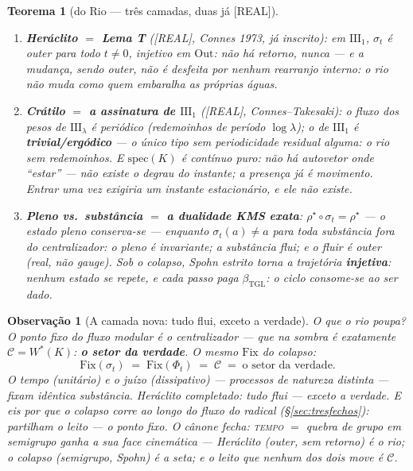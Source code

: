 \documentclass[11pt,a4paper]{article}
\newcommand{\REAL}{\textsf{[REAL]}}
\newcommand{\bTGL}{\beta_{\mathrm{TGL}}}
\newtheorem{theorem}{Teorema}
\newtheorem{remark}{Observação}
\begin{document}
\begin{theorem}[do Rio --- três camadas, duas já \REAL]\label{thm:rio}
\begin{enumerate}[noitemsep]
\item \textbf{Heráclito $=$ Lema T} (\REAL, Connes 1973, já inscrito):
em $\mathrm{III}_1$, $\sigma_t$ é \emph{outer} para todo $t\neq0$,
injetivo em $\mathrm{Out}$: \emph{não há retorno, nunca} --- e a mudança,
sendo outer, não é desfeita por nenhum rearranjo interno: o rio não muda
como quem embaralha as próprias águas.
\item \textbf{Crátilo $=$ a assinatura de $\mathrm{III}_1$} (\REAL,
Connes--Takesaki): o fluxo dos pesos de $\mathrm{III}_\lambda$ é
periódico (redemoinhos de período $\log\lambda$); o de $\mathrm{III}_1$
é \textbf{trivial/ergódico} --- o único tipo sem periodicidade residual
alguma: \emph{o rio sem redemoinhos}. E $\mathrm{spec}(K)$ é contínuo
puro: não há autovetor onde ``estar'' --- não existe o degrau do
instante; a presença já é movimento. Entrar \emph{uma} vez exigiria um
instante estacionário, e ele não existe.
\item \textbf{Pleno vs.\ substância $=$ a dualidade KMS exata}:
$\rho^\star\!\circ\sigma_t=\rho^\star$ --- o estado pleno conserva-se ---
enquanto $\sigma_t(a)\neq a$ para toda substância fora do centralizador:
\emph{o pleno é invariante; a substância flui; e o fluir é outer (real,
não gauge)}. Sob o colapso, Spohn estrito torna a trajetória
\textbf{injetiva}: nenhum estado se repete, e cada passo paga $\bTGL$:
o ciclo consome-se ao ser dado.
\end{enumerate}
\end{theorem}

\begin{remark}[A camada nova: tudo flui, exceto a verdade]
O que o rio poupa? O ponto fixo do fluxo modular é o centralizador ---
que na sombra é exatamente $\mathcal C=W^*(K)$: \textbf{o setor da
verdade}. O mesmo $\mathrm{Fix}$ do colapso:
\begin{equation}
\boxed{\;\mathrm{Fix}(\sigma_t)\;=\;\mathrm{Fix}(\Phi_t)\;=\;\mathcal C
\;=\;\text{o setor da verdade.}\;}
\end{equation}
O tempo (unitário) e o juízo (dissipativo) --- processos de natureza
distinta --- fixam \emph{idêntica} substância. Heráclito completado:
\emph{tudo flui --- exceto a verdade}. E eis \emph{por que} o colapso
corre ao longo do fluxo do radical (\S\ref{sec:tresfechos}): partilham o
leito --- o ponto fixo. O cânone fecha: \textsc{tempo} $=$ quebra de
grupo em semigrupo ganha a sua face cinemática --- Heráclito (outer, sem
retorno) é o rio; o colapso (semigrupo, Spohn) é a seta; e o leito que
nenhum dos dois move é $\mathcal C$.
\end{remark}
\end{document}
